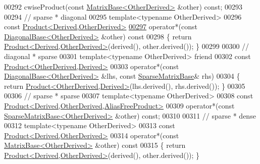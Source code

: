 \begin{DoxyCode}
00292     cwiseProduct(\textcolor{keyword}{const} \hyperlink{group___core___module_class_eigen_1_1_matrix_base}{MatrixBase<OtherDerived>} &other) \textcolor{keyword}{const};
00293 
00294     \textcolor{comment}{// sparse * diagonal}
00295     \textcolor{keyword}{template}<\textcolor{keyword}{typename} OtherDerived>
00296     \textcolor{keyword}{const} \hyperlink{group___core___module_class_eigen_1_1_product}{Product<Derived,OtherDerived>}
\hyperlink{group___sparse_core___module_ad511aa3f5b977089238bf0903f8f2267}{00297}     operator*(\textcolor{keyword}{const} \hyperlink{class_eigen_1_1_diagonal_base}{DiagonalBase<OtherDerived>} &other)\textcolor{keyword}{ const}
00298 \textcolor{keyword}{    }\{ \textcolor{keywordflow}{return} \hyperlink{group___core___module_class_eigen_1_1_product}{Product<Derived,OtherDerived>}(derived(), other.derived()); \}
00299 
00300     \textcolor{comment}{// diagonal * sparse}
00301     \textcolor{keyword}{template}<\textcolor{keyword}{typename} OtherDerived> \textcolor{keyword}{friend}
00302     \textcolor{keyword}{const} \hyperlink{group___core___module_class_eigen_1_1_product}{Product<OtherDerived,Derived>}
00303     operator*(\textcolor{keyword}{const} \hyperlink{class_eigen_1_1_diagonal_base}{DiagonalBase<OtherDerived>} &lhs, \textcolor{keyword}{const} 
      \hyperlink{group___sparse_core___module_class_eigen_1_1_sparse_matrix_base}{SparseMatrixBase}& rhs)
00304     \{ \textcolor{keywordflow}{return} \hyperlink{group___core___module_class_eigen_1_1_product}{Product<OtherDerived,Derived>}(lhs.derived(), rhs.derived()); \}
00305     
00306     \textcolor{comment}{// sparse * sparse}
00307     \textcolor{keyword}{template}<\textcolor{keyword}{typename} OtherDerived>
00308     \textcolor{keyword}{const} \hyperlink{group___core___module_class_eigen_1_1_product}{Product<Derived,OtherDerived,AliasFreeProduct>}
00309     operator*(\textcolor{keyword}{const} \hyperlink{group___sparse_core___module_class_eigen_1_1_sparse_matrix_base}{SparseMatrixBase<OtherDerived>} &other) \textcolor{keyword}{const};
00310     
00311     \textcolor{comment}{// sparse * dense}
00312     \textcolor{keyword}{template}<\textcolor{keyword}{typename} OtherDerived>
00313     \textcolor{keyword}{const} \hyperlink{group___core___module_class_eigen_1_1_product}{Product<Derived,OtherDerived>}
00314     operator*(\textcolor{keyword}{const} \hyperlink{group___core___module_class_eigen_1_1_matrix_base}{MatrixBase<OtherDerived>} &other)\textcolor{keyword}{ const}
00315 \textcolor{keyword}{    }\{ \textcolor{keywordflow}{return} \hyperlink{group___core___module_class_eigen_1_1_product}{Product<Derived,OtherDerived>}(derived(), other.derived()); \}

\end{DoxyCode}

